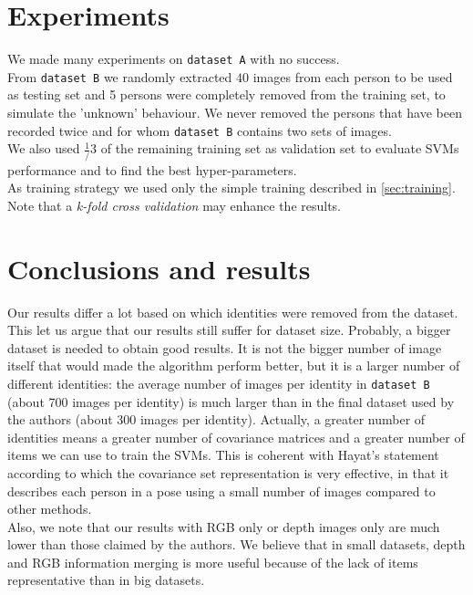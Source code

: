 \documentclass{article}
\begin{document}
\section{Experiments}
We made many experiments on \verb|dataset A| with no success. \\
From \verb|dataset B| we randomly extracted $40$ images from each person to be used as testing set and 5 persons were completely removed from the training set, to simulate the 'unknown' behaviour. We never removed the persons that have been recorded twice and for whom \verb|dataset B| contains two sets of images. \\
We also used $\frac{1}/{3}$ of the remaining training set as validation set to evaluate SVMs performance and to find the best hyper-parameters. \\
As training strategy we used only the simple training described in \ref{sec:training}. Note that a \textit{k-fold cross validation} may enhance the results.

\section{Conclusions and results}
Our results differ a lot based on which identities were removed from the dataset. \\
This let us argue that our results still suffer for dataset size. Probably, a bigger dataset is needed to obtain good results. It is not the bigger number of image itself that would made the algorithm perform better, but it is a larger number of different identities: the average number of images per identity in \verb|dataset B| (about 700 images per identity) is much larger than in the final dataset used by the authors (about 300 images per identity). Actually, a greater number of identities means a greater number of covariance matrices and a greater number of items we can use to train the SVMs. This is coherent with Hayat's statement according to which the covariance set representation is very effective, in that it describes each person in a pose using a small number of images compared to other methods. \\

Also, we note that our results with RGB only or depth images only are much lower than those claimed by the authors. We believe that in small datasets, depth and RGB information merging is more useful because of the lack of items representative than in big datasets. \\
\end{document}
